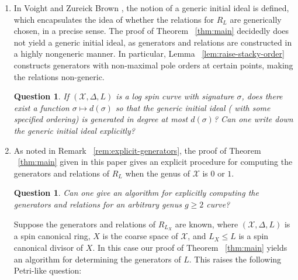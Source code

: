\documentclass{amsart}
\theoremstyle{plain}
\newtheorem{question}[thm]{Question}
\theoremstyle{definition}
\theoremstyle{remark}
\numberwithin{equation}{section}
\newcommand \sx{\mathscr X}
\DeclareMathOperator\di{Div}
\begin{document}
\begin{enumerate}
\begin{question}
\label{ques:fractional-weight}
If $\sx$ is a stacky curve and $D \in \di \sx$ with $nD \sim K,$ where $K$ is the canonical divisor of $\sx$, can one bound the degrees of generators and relations of $R_D$?
\end{question}
Note that that the above question is answered affirmatively in the case that $\sx$ has genus $0$ and $D$ is effective, as follows by inductively applying Lemma ~\ref{lem:sat-1}: If $\sx$ has signature $(g;e_1, \ldots, e_r; \delta)$ then $D$ is generated in degree at most $e = \max(e_1, \ldots, e_r)$ with relations in degree at most $2e$. Additionally, it may be possible to modify the proof of Lemma ~\ref{lem:raise-stacky-order} to extend to the setting of fractional weight modular forms. Given suitable generalizations of these lemmas, one may be able to approach the problem of finding generators and relations for fractional weight modular forms using techniques similar to those in this paper.
	\item In Voight and Zureick Brown \cite[Definition 2.2.7]{vzb:stacky}, the notion of a generic initial ideal is defined, which encapsulates the idea of whether the relations for $R_L$ are generically chosen, in a precise sense. The proof of Theorem ~\ref{thm:main} decidedly does not yield a generic initial ideal, as generators and relations are constructed in a highly nongeneric manner. In particular, Lemma ~\ref{lem:raise-stacky-order} constructs generators with non-maximal pole orders at certain points, making the relations non-generic. 
\begin{question}
\label{ques:generic-initial}
If $(\sx,\Delta,L)$ is a log spin curve with signature $\sigma$, does there exist a function $\sigma \mapsto d(\sigma)$ so that the generic initial ideal {\rm(} with some specified ordering{\rm)} is generated in degree at most $d(\sigma)$? Can one write down the generic initial ideal explicitly?
\end{question}
	\item As noted in Remark ~\ref{rem:explicit-generators}, the proof of Theorem ~\ref{thm:main} given in this paper gives an explicit procedure for computing the generators and relations of $R_L$ when the genus of $\sx$ is $0$ or $1$.
\begin{question}
\label{ques:algorithm}
Can one give an algorithm for explicitly computing the generators and relations for an arbitrary genus $g \geq 2$ curve?
\end{question}
Suppose the generators and relations of $R_{L_X}$ are known, where $(\sx, \Delta, L)$ is a spin canonical ring, $X$ is the coarse space of $\sx$, and $L_X \leq L$ is a spin canonical divisor of $X$. In this case our proof of Theorem ~\ref{thm:main} yields an algorithm for determining the generators of $L$. This raises the following Petri-like question:

\end{enumerate}
\end{document}
